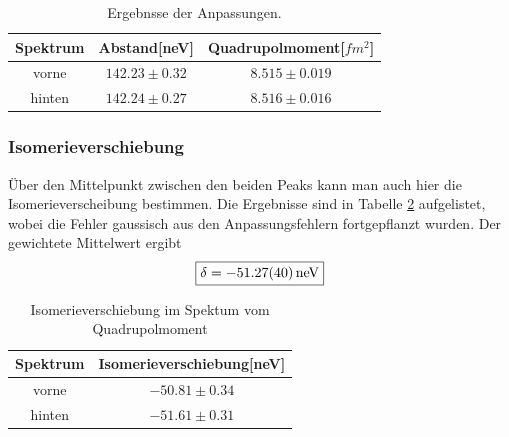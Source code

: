 \documentclass[12pt,a4paper]{article}
\begin{document}
\begin{table}
\centering
\begin{tabular}{|c|c|c|}
\hline
Spektrum & Abstand[neV] & Quadrupolmoment[$\si{fm^2}$]\\
\hline
vorne & $ 142.23 \pm 0.32 $ & $ 8.515 \pm 0.019 $\\
\hline
\hline
hinten & $ 142.24 \pm 0.27 $ & $ 8.516 \pm 0.016 $\\
\hline
\end{tabular}
\caption{Ergebnsse der Anpassungen.}
\label{tab:Quad_ergebnis}
\end{table}

\subsubsection{Isomerieverschiebung}
Über den Mittelpunkt zwischen den beiden Peaks kann man auch hier die Isomerieverscheibung bestimmen. Die Ergebnisse sind in Tabelle \ref{tab:Quad_Iso} aufgelistet, wobei die Fehler gaussisch aus den Anpassungsfehlern fortgepflanzt wurden. Der gewichtete Mittelwert ergibt
\begin{equation*}
\boxed{\delta = \SI{-51.27\pm 0.40}{neV}}
\end{equation*}

\begin{table}
\centering
\begin{tabular}{|c|c|}
\hline
Spektrum & Isomerieverschiebung[neV]\\
\hline
vorne & $ -50.81\pm 0.34 $\\
\hline
\hline
hinten & $ -51.61 \pm 0.31 $\\
\hline
\end{tabular}
\caption{Isomerieverschiebung im Spektum vom Quadrupolmoment}
\label{tab:Quad_Iso}
\end{table}
\newpage
\end{document}
